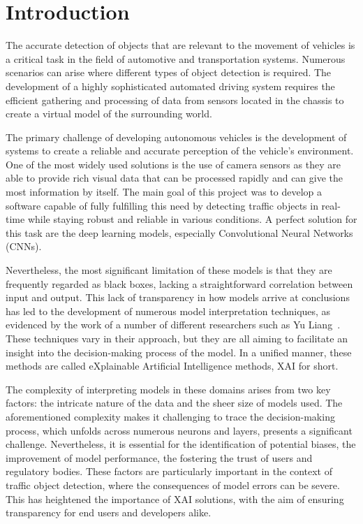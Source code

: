 
\section{Introduction}\label{sec:introduction}
The accurate detection of objects that are relevant to the movement of vehicles is a critical task in the field of automotive and transportation systems.
Numerous scenarios can arise where different types of object detection is required.
The development of a highly sophisticated automated driving system requires the efficient gathering and processing of data from sensors located in the chassis to create a virtual model of the surrounding world.

The primary challenge of developing autonomous vehicles is the development of systems  to create a reliable and accurate perception of the vehicle's environment.
One of the most widely used solutions is the use of camera sensors as they are able to
provide rich visual data that can be processed rapidly and can give the most information by itself.
The main goal of this project was to develop a software capable of fully fulfilling this need by detecting traffic
objects in real-time while staying robust and reliable in various conditions.
A perfect solution for this task are the deep learning models, especially Convolutional Neural Networks (CNNs).

Nevertheless, the most significant limitation of these models is that they are frequently regarded as black boxes, lacking a straightforward correlation between input and output.
This lack of transparency in how models arrive at conclusions has led to the development of numerous model interpretation techniques,
as evidenced by the work of a number of different researchers such as Yu Liang~\cite{LIANG2021168}.
These techniques vary in their approach, but they are all aiming to facilitate an insight into the decision-making process of the model.
In a unified manner, these methods are called eXplainable Artificial Intelligence methods, XAI for short.


The complexity of interpreting models in these domains arises from two key factors: the intricate nature of the data and the sheer size of models used.
The aforementioned complexity makes it challenging to trace the decision-making process, which unfolds across numerous neurons and layers,
presents a significant challenge.
Nevertheless, it is essential for the identification of potential biases, the improvement of model performance, the fostering the trust of users and regulatory bodies.
These factors are particularly important in the context of traffic object detection, where the consequences of model errors can be severe.
This has heightened the importance of XAI solutions, with the aim of ensuring transparency for end users and developers alike.

